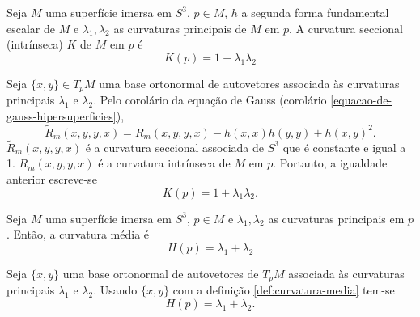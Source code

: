 
\begin{proposicao}
	Seja $M$ uma superfície imersa em $S^3$,
	$p \in M$,
	$h$ a segunda forma fundamental escalar de $M$ e
	$\lambda_1, \lambda_2$ as curvaturas principais de $M$ em $p$.
	A curvatura seccional (intrínseca) $K$ de $M$ em $p$ é
	\begin{equation*}
		K(p) = 1 + \lambda_1 \lambda_2
	\end{equation*}
\end{proposicao}

\begin{demonstracao}
	Seja $\{x,y\} \in T_p M$ uma base ortonormal de autovetores associada às curvaturas principais $\lambda_1$ e $\lambda_2$.
	Pelo corolário da equação de Gauss (corolário \ref{equacao-de-gauss-hipersuperficies}),
	\begin{equation*}
		\tilde{R}_m(x,y,y,x) = R_m(x,y,y,x) - h(x,x) h(y,y) + h(x,y)^2.
	\end{equation*}
	$\tilde{R}_m(x,y,y,x)$ é a curvatura seccional associada de $S^3$ que é constante e igual a 1. 
	$R_m(x,y,y,x)$ é a curvatura intrínseca de $M$ em $p$. Portanto, a igualdade anterior escreve-se
	\begin{equation*}
		K(p) = 1 + \lambda_1 \lambda_2.
	\end{equation*}
\end{demonstracao}



\begin{proposicao}
	Seja $M$ uma superfície imersa em $S^3$,
	$p \in M$ e
	$\lambda_1, \lambda_2$ as curvaturas principais em $p$.
	Então, a curvatura média é
	\begin{equation*}
		H(p) = \lambda_1 + \lambda_2
	\end{equation*}
\end{proposicao}

\begin{demonstracao}
	Seja $\{x,y\}$ uma base ortonormal de autovetores de $T_p M$ associada às curvaturas principais $\lambda_1$ e $\lambda_2$.
	Usando $\{x,y\}$ com a definição \ref{def:curvatura-media} tem-se
	\begin{equation*}
		H(p) = \lambda_1 + \lambda_2.
	\end{equation*}
\end{demonstracao}

